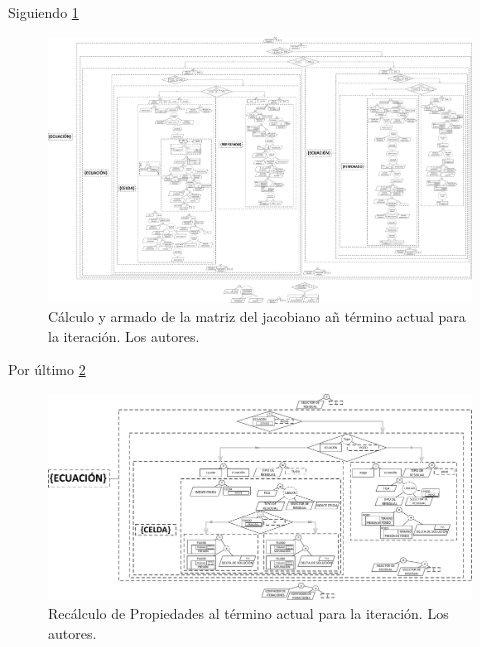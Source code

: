 Siguiendo \ref{fig:Jacobiano} \\ %

\begin{figure}[h]
	\centering%
	\includegraphics[width=\linewidth]{Fig/Jacobiano.pdf}%
	\caption{Cálculo y armado de la matriz del jacobiano añ término actual para la iteración. Los autores.} \label{fig:Jacobiano}
\end{figure}

Por último \ref{fig:UpdateVariables} \\

\begin{figure}[h]
	\centering%
	\includegraphics[width=\linewidth]{Fig/ActualizacionDeIncognitas.pdf}%
	\caption{Recálculo de Propiedades al término actual para la iteración. Los autores.} \label{fig:UpdateVariables}
\end{figure}


